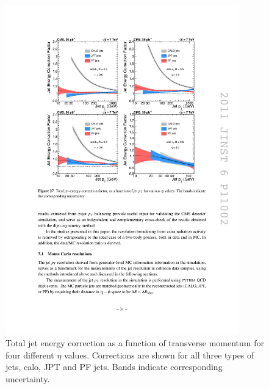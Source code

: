 \begin{figure}[htbp]
	\centering
		\includegraphics[width=0.9\textwidth]{Figures/jet_tot_corr_pt.pdf}
	\caption[Total jet energy correction as a function of transverse momentum for four different $\eta$ values.]{Total jet energy correction as a function of transverse momentum for four different $\eta$ values. Corrections are shown for all three types of jets, calo, JPT and PF jets. Bands indicate corresponding uncertainty.\cite{Chatrchyan:2011ds}}
	\label{fig:tot_corr_pt}
\end{figure}

